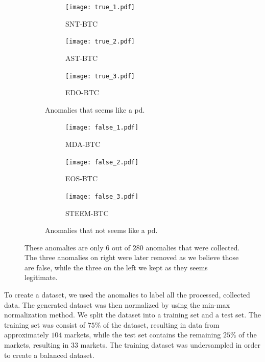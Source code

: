 \begin{figure}[hbt!]
    \centering
    \begin{subfigure}{.49\textwidth}
        \centering
        \begin{subfigure}{\textwidth}
            \texttt{[image: true\_1.pdf]}
            \caption*{SNT-BTC}
        \end{subfigure}
        \begin{subfigure}{\textwidth}
            \texttt{[image: true\_2.pdf]}
            \caption*{AST-BTC}
        \end{subfigure}
        \begin{subfigure}{\textwidth}
            \texttt{[image: true\_3.pdf]}
            \caption*{EDO-BTC}
        \end{subfigure}
        \caption{Anomalies that seems like a \ac{pd}.}
        \label{fig:label_true}
    \end{subfigure}
    \hfill
    \begin{subfigure}{.49\textwidth}
        \centering
        \begin{subfigure}{\textwidth}
            \texttt{[image: false\_1.pdf]}
            \caption*{MDA-BTC}
        \end{subfigure}
        \begin{subfigure}{\textwidth}
            \texttt{[image: false\_2.pdf]}
            \caption*{EOS-BTC}
        \end{subfigure}
        \begin{subfigure}{\textwidth}
            \texttt{[image: false\_3.pdf]}
            \caption*{STEEM-BTC}
        \end{subfigure}
        \caption{Anomalies that not seems like a \ac{pd}.}
        \label{fig:label_false}    
    \end{subfigure}
    \caption[Anomalies in the dataset]{These anomalies are only $6$ out of $280$ anomalies that were collected. The three anomalies on right were later removed as we believe those are false, while the three on the left we kept as they seems legitimate.}
\end{figure}


To create a dataset, we used the anomalies to label all the processed, collected data. The generated dataset was then normalized by using the min-max normalization method. We split the dataset into a training set and a test set. The training set was consist of $75\%$ of the dataset, resulting in data from approximately $104$ markets, while the test set contains the remaining $25\%$ of the markets, resulting in $33$ markets. The training dataset was undersampled in order to create a balanced dataset.

